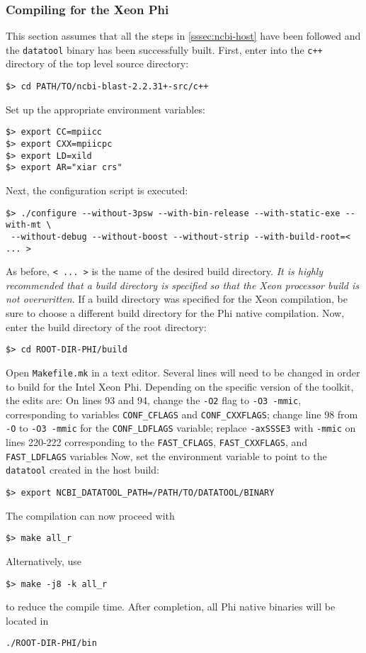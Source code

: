 \documentclass[10pt]{article}
\begin{document}
\subsubsection{Compiling for the Xeon Phi} \label{sssec:ncbi-phi}

This section assumes that all the steps in \ref{sssec:ncbi-host} have been followed and the \verb^datatool^ binary has been successfully built.  First, enter into the \verb^c++^ directory of the top level source directory:
\begin{verbatim}
$> cd PATH/TO/ncbi-blast-2.2.31+-src/c++
\end{verbatim}
Set up the appropriate environment variables:
\begin{verbatim}
$> export CC=mpiicc
$> export CXX=mpiicpc
$> export LD=xild
$> export AR="xiar crs" 
\end{verbatim}
\noindent Next, the configuration script is executed:
\begin{verbatim}
$> ./configure --without-3psw --with-bin-release --with-static-exe --with-mt \
 --without-debug --without-boost --without-strip --with-build-root=< ... >
\end{verbatim}
\noindent As before, \verb^< ... >^ is the name of the desired build directory.  \emph{It is highly recommended that a build directory is specified so that the Xeon processor build is not overwritten}. If a build directory was specified for the Xeon compilation,
be sure to choose a different build directory for the Phi native compilation.  Now, enter the build directory of the root directory:
\begin{verbatim}
$> cd ROOT-DIR-PHI/build
\end{verbatim}
\noindent Open \verb^Makefile.mk^ in a text editor.  Several lines will need to be changed in order to build for the Intel Xeon Phi.  Depending on the specific version of the toolkit, the edits are:
On lines 93 and 94, change the \verb^-O2^ flag to \verb^-O3 -mmic^, corresponding to variables \verb^CONF_CFLAGS^ and \verb^CONF_CXXFLAGS^; change line 98 from \verb^-O^ to \verb^-O3 -mmic^ for the \verb^CONF_LDFLAGS^ variable; replace \verb^-axSSSE3^ with \verb^-mmic^ on lines 220-222 corresponding to the \verb^FAST_CFLAGS^, \verb^FAST_CXXFLAGS^, and \verb^FAST_LDFLAGS^ variables
\noindent Now, set the environment variable to point to the \verb^datatool^ created in the host build:
\begin{verbatim}
$> export NCBI_DATATOOL_PATH=/PATH/TO/DATATOOL/BINARY
\end{verbatim}
\noindent The compilation can now proceed with
\begin{verbatim}
$> make all_r
\end{verbatim}
\noindent Alternatively, use
\begin{verbatim}
$> make -j8 -k all_r
\end{verbatim}
\noindent to reduce the compile time.  After completion, all Phi native binaries will be located in
\begin{verbatim}
./ROOT-DIR-PHI/bin
\end{verbatim}
\end{document}
